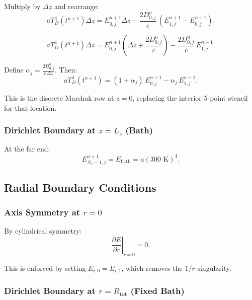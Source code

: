 \documentclass[12pt,oneside]{article}
\begin{document}
Multiply by $\Delta z$ and rearrange:
\begin{equation}
a T_D^4(t^{n+1}) \Delta z
=
E_{0,j}^{n+1} \Delta z - \frac{2D^n_{0,j}}{c}\,(E_{1,j}^{n+1} - E_{0,j}^{n+1}).
\end{equation}

\begin{equation}
a T_D^4(t^{n+1}) \Delta z
=
E_{0,j}^{n+1}\left(\Delta z + \frac{2D^n_{0,j}}{c}\right) - \frac{2D^n_{0,j}}{c}\,E_{1,j}^{n+1}.
\end{equation}

Define $\alpha_j = \frac{2D^n_{0,j}}{c\,\Delta z}$. Then:
\begin{equation}
a T_D^4(t^{n+1}) = (1 + \alpha_j)\,E_{0,j}^{n+1} - \alpha_j\,E_{1,j}^{n+1}.
\label{eq:marshak_row_z0}
\end{equation}

This is the discrete Marshak row at $z=0$, replacing the interior 5-point stencil for that location.

\subsubsection{Dirichlet Boundary at $z = L_z$ (Bath)}

At the far end:
\begin{equation}
E^{n+1}_{N_z-1,j} = E_{\mathrm{bath}} = a(300\text{ K})^4.
\end{equation}

\subsection{Radial Boundary Conditions}

\subsubsection{Axis Symmetry at $r = 0$}

By cylindrical symmetry:
\begin{equation}
\left.\frac{\partial E}{\partial r}\right|_{r=0} = 0.
\end{equation}

This is enforced by setting $E_{i,0} = E_{i,1}$, which removes the $1/r$ singularity.

\subsubsection{Dirichlet Boundary at $r = R_{\mathrm{tot}}$ (Fixed Bath)}
\end{document}
